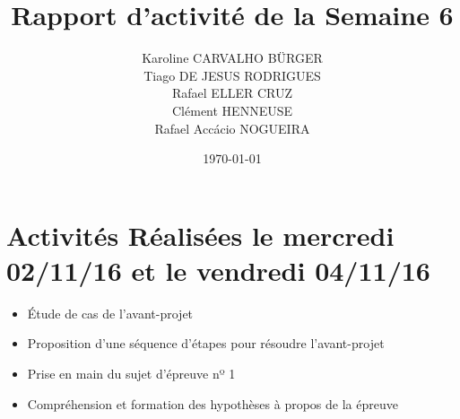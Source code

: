 \documentclass[11pt,a4paper,onecolumn]{articlewithlogo}
\title{Rapport d'activité de la Semaine 6}
\author{Karoline CARVALHO BÜRGER\\ Tiago DE JESUS RODRIGUES\\  Rafael ELLER CRUZ \\ Clément HENNEUSE\\ Rafael Accácio NOGUEIRA }
\date{\today}
\begin{document}
\maketitle
\section{Activités Réalisées le mercredi 02/11/16 et le vendredi 04/11/16  }
\begin{itemize}
	\renewcommand\labelitemi{$\circ$}
	\item Étude de cas de l'avant-projet
	\item Proposition d'une séquence d'étapes pour résoudre l'avant-projet
	\item Prise en main du sujet d'épreuve nº 1 
	\item Compréhension et formation des hypothèses à propos de la épreuve  
\end{itemize}


%
\end{document}
